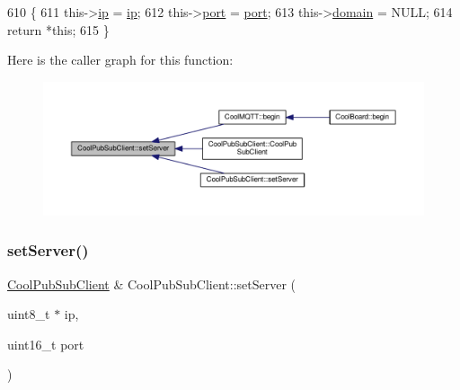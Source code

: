\begin{DoxyCode}
610                                                                          \{
611     this->\hyperlink{class_cool_pub_sub_client_adabd958c6c3462433a3f3393f40a0966}{ip} = \hyperlink{class_cool_pub_sub_client_adabd958c6c3462433a3f3393f40a0966}{ip};
612     this->\hyperlink{class_cool_pub_sub_client_a01e3249102c057756af7a515c179844e}{port} = \hyperlink{class_cool_pub_sub_client_a01e3249102c057756af7a515c179844e}{port};
613     this->\hyperlink{class_cool_pub_sub_client_a08d3a5619724f3408ad406ca4fb776e1}{domain} = NULL;
614     \textcolor{keywordflow}{return} *\textcolor{keyword}{this};
615 \}
\end{DoxyCode}
Here is the caller graph for this function\+:\nopagebreak
\begin{figure}[H]
\begin{center}
\leavevmode
\includegraphics[width=350pt]{d8/d4b/class_cool_pub_sub_client_a947e70c394c66c7d08d0c53caf8425e3_icgraph}
\end{center}
\end{figure}
\mbox{\label{class_cool_pub_sub_client_ad589f977fc2799b9341dc5f4fcdb483a}} 
\subsubsection{\texorpdfstring{set\+Server()}{setServer()}\hspace{0.1cm}{\footnotesize\ttfamily [2/3]}}
{\footnotesize\ttfamily \hyperlink{class_cool_pub_sub_client}{Cool\+Pub\+Sub\+Client} \& Cool\+Pub\+Sub\+Client\+::set\+Server (\begin{DoxyParamCaption}\item[{uint8\+\_\+t $\ast$}]{ip,  }\item[{uint16\+\_\+t}]{port }\end{DoxyParamCaption})}



